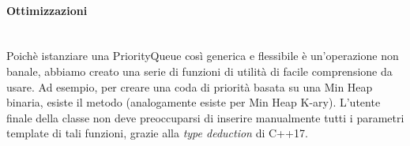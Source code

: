 \paragraph{Ottimizzazioni}\mbox{} \\

\noindent Poichè istanziare una PriorityQueue così generica e flessibile è un'operazione non banale, abbiamo creato una serie di funzioni di utilità di facile comprensione da usare. Ad esempio, per creare una coda di priorità basata su una Min Heap binaria, esiste il metodo  (analogamente esiste  per Min Heap K-ary).
L'utente finale della classe non deve preoccuparsi di inserire manualmente tutti i parametri template di tali funzioni, grazie alla \textit{type deduction} di C++17.

